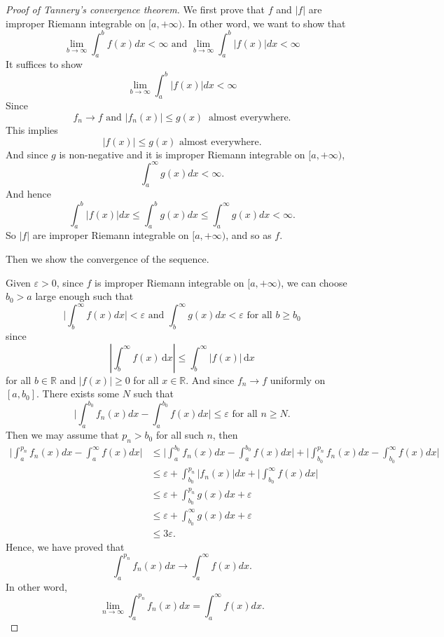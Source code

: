 \begin{proof}[Proof of Tannery's convergence theorem]
    We first prove that $f$ and $\vert f\vert$ are improper Riemann integrable on $[a, + \infty)$.
    In other word, we want to show that 
    \[
        \lim_{b \to \infty} \int_a^{b} f(x) dx < \infty \text{ and } \lim_{b \to \infty} \int_a^{b} \lvert f(x) \rvert dx < \infty
    \]
    It suffices to show \[
        \lim_{b \to \infty} \int_a^{b} \lvert f(x) \rvert dx < \infty
    \]
    Since 
    \[
        f_n \to f \text{ and } \lvert f_n(x) \rvert \le g(x)\ \text{ almost everywhere.}
    \]
    This implies
    \[
        \lvert f(x) \rvert \le g(x)\text{ almost everywhere.} 
    \]
    And since $g$ is non-negative and it is improper Riemann integrable on $[a,+ \infty)$,
    \[
        \int_{a}^{\infty} g(x) dx < \infty.
    \]
    And hence
    \[
        \int_{a}^{b} \lvert f(x)\rvert dx \le \int_{a}^{b} g(x) dx \le \int_{a}^{\infty} g(x) dx < \infty.
    \]
    So $\vert f\vert$ are improper Riemann integrable on $[a, +\infty)$, and so as $f$.

    Then we show the convergence of the sequence.

    Given $\varepsilon > 0$, since $f$ is improper Riemann integrable on $[a, +\infty)$, we can choose $b_0 > a$ large enough such that
    \[
        \big \lvert \int_b^{\infty} f(x) dx \big \rvert < \varepsilon \text{ and } \int_b^{\infty} g(x) dx < \varepsilon\text{ for all $b \ge b_0$}
    \]
    since
    \[
    \left\vert \int_b^{\infty} f(x) \, \mathrm{d}  x\right\vert \le \int_b^{\infty} \vert f(x) \vert \, \mathrm{d} x
    \]
    for all $b \in \mathbb{R}$ and $\vert f(x) \vert \ge 0$ for all $x \in \mathbb{R}$.
    And since $f_n \to f$ uniformly on $[a, b_0]$. There exists some $N$ such that
    \[
        \big \lvert \int_{a}^{b_0} f_n(x) dx - \int_{a}^{b_0} f(x) dx\big \rvert \le \varepsilon \text{ for all $n \ge N$.}
    \]
    Then we may assume that $p_n > b_0$ for all such $n$, then 
    \[
        \begin{aligned}
        \big \lvert \int_{a}^{p_n} f_n(x) dx - \int_{a}^{\infty} f(x) dx \big \rvert &\le   \big \lvert \int_{a}^{b_0} f_n(x) dx - \int_{a}^{b_0} f(x) dx \big \rvert + \big \lvert \int_{b_0}^{p_n} f_n(x) dx - \int_{b_0}^{\infty} f(x) dx \big \rvert \\
        &\le \varepsilon + \int_{b_0}^{p_n} \lvert f_n(x) \rvert dx + \lvert\int_{b_0}^{\infty} f(x) dx \big \rvert \\
        &\le \varepsilon + \int_{b_0}^{p_n} g(x) dx + \varepsilon \\
        &\le \varepsilon + \int_{b_0}^{\infty} g(x) dx + \varepsilon \\
        &\le 3\varepsilon.
        \end{aligned}
    \]
    Hence, we have proved that
    \[
        \int_{a}^{p_n} f_n(x) dx \to \int_{a}^{\infty} f(x) dx.
    \]
    In other word,
    \[
        \lim_{n \to \infty} \int_{a}^{p_n} f_n(x) dx = \int_{a}^{\infty} f(x) dx.
    \]
\end{proof}


